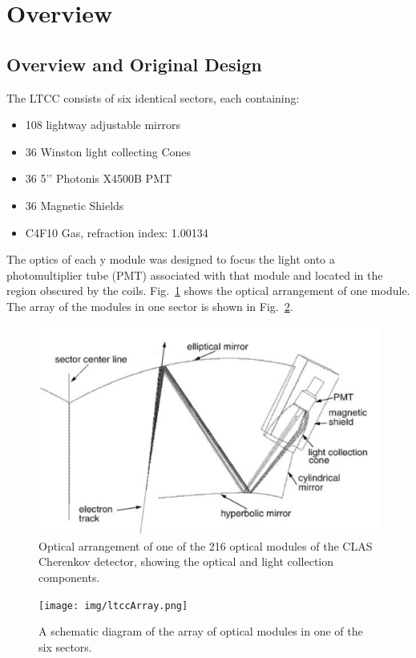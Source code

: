 \section{Overview}

\subsection{Overview and Original Design}

The LTCC consists of six identical sectors, each containing:

\begin{itemize}
	\item 108 lightway adjustable mirrors
	\item 36 Winston light collecting Cones
	\item 36 5’’ Photonis X4500B PMT
	\item 36 Magnetic Shields
	\item C4F10 Gas, refraction index: 1.00134
\end{itemize}


The optics of each y module was designed to focus the light onto a photomultiplier tube (PMT) associated with that module and located in the region obscured by the coils.
Fig.~\ref{fig:optics} shows the optical arrangement of one module. The array of the modules in one sector is shown in Fig.~\ref{fig:ltccArray}.

\begin{figure}[hbt]
	\centering
	\includegraphics[width=1.0\columnwidth,keepaspectratio]{img/optics.png}
	\caption{Optical arrangement of one of the 216 optical modules of the CLAS Cherenkov detector, showing the optical and light collection components.}
	\label{fig:optics}
\end{figure}

\begin{figure}[hbt]
\centering
\texttt{[image: img/ltccArray.png]}
\caption{A schematic diagram of the array of optical modules in one of the six sectors.}
\label{fig:ltccArray}
\end{figure}
